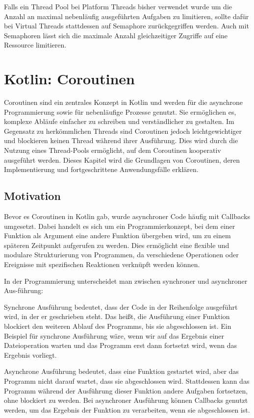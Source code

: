 \documentclass[fontsize=12pt,paper=a4,twoside=semi,parskip=half-,headsepline,headinclude]{scrreprt}
\begin{document}
Falls ein Thread Pool bei Platform Threads bisher verwendet wurde um die Anzahl an maximal nebenläufig ausgeführten Aufgaben zu limitieren, sollte dafür bei Virtual Threads stattdessen auf Semaphore zurückgegriffen werden. Auch mit Semaphoren lässt sich die maximale Anzahl gleichzeitiger Zugriffe auf eine Ressource limitieren.

\newpage

\section{Kotlin: Coroutinen}

Coroutinen sind ein zentrales Konzept in Kotlin und werden für die asynchrone Programmierung sowie für nebenläufige Prozesse genutzt. Sie ermöglichen es, komplexe Abläufe einfacher zu schreiben und verständlicher zu gestalten. Im Gegensatz zu herkömmlichen Threads sind Coroutinen jedoch leichtgewichtiger und blockieren keinen Thread während ihrer Ausführung. Dies wird durch die Nutzung eines Thread-Pools ermöglicht, auf dem Coroutinen kooperativ ausgeführt werden. Dieses Kapitel wird die Grundlagen von Coroutinen, deren Implementierung und fortgeschrittene Anwendungsfälle erklären.

\subsection{Motivation}

Bevor es Coroutinen in Kotlin gab, wurde asynchroner Code häufig mit Callbacks umgesetzt. Dabei handelt es sich um ein Programmierkonzept, bei dem einer Funktion als Argument eine andere Funktion übergeben wird, um zu einem späteren Zeitpunkt aufgerufen zu werden. Dies ermöglicht eine flexible und modulare Strukturierung von Programmen, da verschiedene Operationen oder Ereignisse mit spezifischen Reaktionen verknüpft werden können. 

In der Programmierung unterscheidet man zwischen synchroner und asynchroner Aus-führung:

Synchrone Ausführung bedeutet, dass der Code in der Reihenfolge ausgeführt wird, in der er geschrieben steht. Das heißt, die Ausführung einer Funktion blockiert den weiteren Ablauf des Programms, bis sie abgeschlossen ist. Ein Beispiel für synchrone Ausführung wäre, wenn wir auf das Ergebnis einer Dateioperation warten und das Programm erst dann fortsetzt wird, wenn das Ergebnis vorliegt.

Asynchrone Ausführung bedeutet, dass eine Funktion gestartet wird, aber das Programm nicht darauf wartet, dass sie abgeschlossen wird. Stattdessen kann das Programm während der Ausführung dieser Funktion andere Aufgaben fortsetzen, ohne blockiert zu werden. Bei asynchroner Ausführung können Callbacks genutzt werden, um das Ergebnis der Funktion zu verarbeiten, wenn sie abgeschlossen ist.
\end{document}
